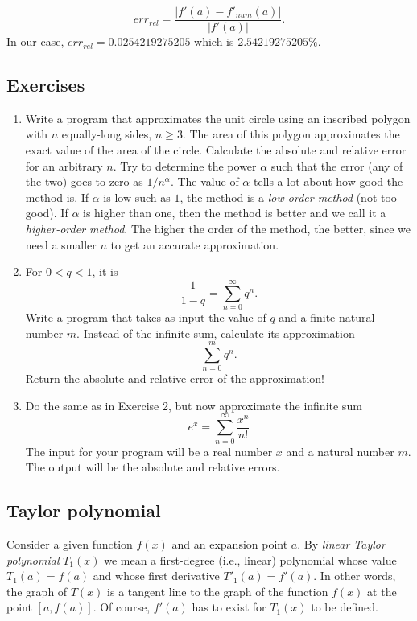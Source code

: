 \documentclass{article}
\begin{document}
$$
err_{rel} = \frac{|f'(a) - f'_{num}(a)|}{|f'(a)|}.
$$
In our case, $err_{rel} = 0.0254219275205$ which is $2.54219275205 \%$.

\subsection{Exercises}

\begin{enumerate}
\item Write a program that approximates the unit circle using an inscribed polygon 
      with $n$ equally-long sides, $n \ge 3$. The area of this polygon approximates the exact
      value of the area of the circle. Calculate the absolute and 
      relative error for an arbitrary $n$. Try to determine the power $\alpha$
      such that the error (any of the two) goes to zero as $1/n^{\alpha}$. The value 
      of $\alpha$ tells a lot about how good the method is. If $\alpha$ is low such 
      as $1$, the method is a {\em low-order method} (not too good). If $\alpha$ is
      higher than one, then the method is better and we call it a {\em higher-order method}.
      The higher the order of the method, the better, since we need a smaller $n$ to
      get an accurate approximation.
\item For $0 < q < 1$, it is 
      $$
      \frac{1}{1-q} = \sum_{n=0}^{\infty} q^n. 
      $$
      Write a program that takes as input the value of $q$ and a finite natural number 
      $m$. Instead of the infinite sum, calculate its approximation 
      $$
      \sum_{n=0}^{m} q^n. 
      $$ 
      Return the absolute and relative error of the approximation!
\item Do the same as in Exercise 2, but now approximate the infinite sum
      $$
      e^x = \sum_{n=0}^{\infty} \frac{x^n}{n!}
      $$
      The input for your program will be a real number $x$ and a natural number $m$.
      The output will be the absolute and relative errors.
\end{enumerate}


\subsection{Taylor polynomial}

Consider a given function $f(x)$ and an expansion point $a$. By {\em linear Taylor polynomial} $T_1(x)$ 
we mean a first-degree (i.e., linear) polynomial whose value $T_1(a) = f(a)$ and whose first derivative 
$T'_1(a) = f'(a)$. In other words, the graph of $T(x)$ is a tangent line to the graph of the function 
$f(x)$ at the point $[a, f(a)]$.
Of course, $f'(a)$ has to exist for $T_1(x)$ to be defined. 
\end{document}
